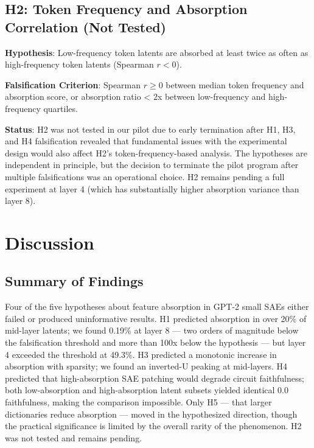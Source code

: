 \documentclass{article}
\begin{document}
\subsection{H2: Token Frequency and Absorption Correlation (Not Tested)}
\label{sec:h2}

\textbf{Hypothesis}: Low-frequency token latents are absorbed at least twice as often as high-frequency token latents (Spearman $r < 0$).

\textbf{Falsification Criterion}: Spearman $r \geq 0$ between median token frequency and absorption score, or absorption ratio < 2x between low-frequency and high-frequency quartiles.

\textbf{Status}: H2 was not tested in our pilot due to early termination after H1, H3, and H4 falsification revealed that fundamental issues with the experimental design would also affect H2's token-frequency-based analysis. The hypotheses are independent in principle, but the decision to terminate the pilot program after multiple falsifications was an operational choice. H2 remains pending a full experiment at layer 4 (which has substantially higher absorption variance than layer 8).

\section{Discussion}
\label{sec:discussion}

\subsection{Summary of Findings}

Four of the five hypotheses about feature absorption in GPT-2 small SAEs either failed or produced uninformative results. H1 predicted absorption in over 20\% of mid-layer latents; we found 0.19\% at layer 8 --- two orders of magnitude below the falsification threshold and more than 100x below the hypothesis --- but layer 4 exceeded the threshold at 49.3\%. H3 predicted a monotonic increase in absorption with sparsity; we found an inverted-U peaking at mid-layers. H4 predicted that high-absorption SAE patching would degrade circuit faithfulness; both low-absorption and high-absorption latent subsets yielded identical 0.0 faithfulness, making the comparison impossible. Only H5 --- that larger dictionaries reduce absorption --- moved in the hypothesized direction, though the practical significance is limited by the overall rarity of the phenomenon. H2 was not tested and remains pending.
\end{document}
